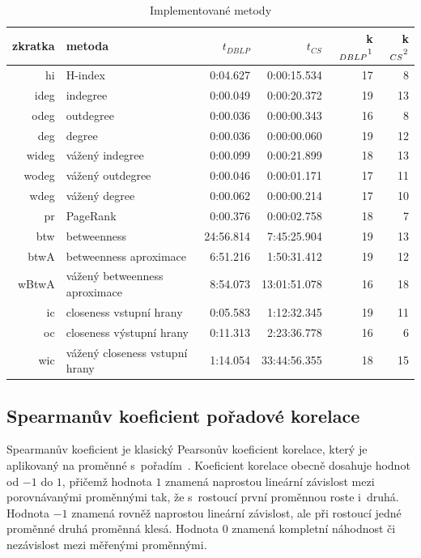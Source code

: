\documentclass{bakalarka}
\begin{document}
\begin{table}[!ht]
\centering
\caption{Implementované metody}
\label{tab:impmetody}
\begin{small}
\begin{tabular}{r|l|r|r|r|r}
\toprule
zkratka & metoda & $t_{DBLP}$ & $t_{CS}$ & k$_{DBLP}\footnotemark[1]$ & k$_{CS}\footnotemark[2]$ \\
\midrule
hi   &H-index                           & 0:04.627& 0:00:15.534&17&8\\
ideg &indegree                          & 0:00.049& 0:00:20.372&19&13\\
odeg &outdegree                         & 0:00.036& 0:00:00.343&16&8\\
deg  &degree                            & 0:00.036& 0:00:00.060&19&12\\
wideg&vážený indegree                   & 0:00.099& 0:00:21.899&18&13\\
wodeg&vážený outdegree                  & 0:00.046& 0:00:01.171&17&11\\
wdeg &vážený degree                     & 0:00.062& 0:00:00.214&17&10\\
pr   &PageRank                          & 0:00.376& 0:00:02.758&18&7\\
btw  &betweenness                       &24:56.814& 7:45:25.904&19&13\\
btwA &betweenness aproximace            & 6:51.216& 1:50:31.412&19&12\\
wBtwA&vážený betweenness aproximace     & 8:54.073&13:01:51.078&16&18\\
\midrule
ic   &closeness vstupní hrany           & 0:05.583& 1:12:32.345&19&11\\
oc   &closeness výstupní hrany          & 0:11.313& 2:23:36.778&16&6\\
wic  &vážený closeness vstupní hrany    & 1:14.054&33:44:56.355&18&15\\
\bottomrule
\end{tabular}
\end{small}
\end{table}


\subsection{Spearmanův koeficient pořadové korelace}
\label{sec:spearman}
Spearmanův koeficient je klasický Pearsonův koeficient korelace, který je
aplikovaný na proměnné s~pořadím~\citep{myerswell2002}. Koeficient korelace
obecně dosahuje hodnot od $-1$ do $1$, přičemž hodnota $1$ znamená naprostou
lineární závislost mezi porovnávanými proměnnými tak, že s~rostoucí první
proměnnou roste i~druhá. Hodnota $-1$ znamená rovněž naprostou lineární
závislost, ale při rostoucí jedné proměnné druhá proměnná klesá. Hodnota $0$
znamená kompletní náhodnost či nezávislost mezi měřenými proměnnými.
\end{document}
